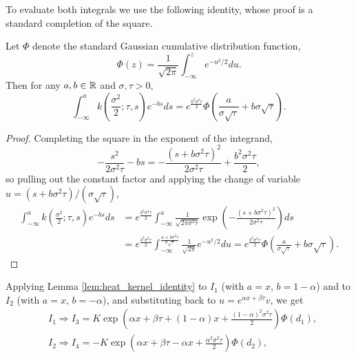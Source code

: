 To evaluate both integrals we use the following identity,
whose proof is a standard completion of the square.
\begin{lemma}\label{lem:heat_kernel_identity}
    Let $\Phi$ denote the standard Gaussian cumulative distribution function,
    \begin{equation*}
        \Phi(z) = \frac{1}{\sqrt{2 \pi}} \int^{z}_{-\infty} e^{-u^2/2} du.
    \end{equation*}
    Then for any $a, b \in \mathbb{R}$ and $\sigma, \tau > 0$,
    \begin{equation}\label{eq:heat_kernel_identity}
        \int^{a}_{-\infty} k\left(\frac{\sigma^2}{2}; \tau, s\right) e^{-b s} ds
            = e^{\frac{b^2 \sigma^2 \tau}{2}} \Phi \left(\frac{a}{\sigma \sqrt{\tau}} + b \sigma \sqrt{\tau}\right).
    \end{equation}
\end{lemma}
\begin{proof}
    Completing the square in the exponent of the integrand,
    \begin{equation*}
        -\frac{s^2}{2 \sigma^2 \tau} - b s
            = -\frac{(s + b \sigma^2 \tau)^2}{2 \sigma^2 \tau} + \frac{b^2 \sigma^2 \tau}{2},
    \end{equation*}
    so pulling out the constant factor and applying the change of variable $u = (s + b \sigma^2 \tau)/(\sigma \sqrt{\tau})$,
    \begin{equation*}
    \begin{aligned}
        \int^{a}_{-\infty} k\left(\tfrac{\sigma^2}{2}; \tau, s\right) e^{-b s} ds
            & = e^{\frac{b^2 \sigma^2 \tau}{2}} \int^{a}_{-\infty} \frac{1}{\sqrt{2 \pi \sigma^2 \tau}} \exp\left( -\frac{(s + b \sigma^2 \tau)^2}{2 \sigma^2 \tau} \right) ds \\
            & = e^{\frac{b^2 \sigma^2 \tau}{2}} \int^{\frac{a + b \sigma^2 \tau}{\sigma \sqrt{\tau}}}_{-\infty} \frac{1}{\sqrt{2 \pi}} e^{-u^2/2} du
            = e^{\frac{b^2 \sigma^2 \tau}{2}} \Phi \left( \frac{a}{\sigma \sqrt{\tau}} + b \sigma \sqrt{\tau} \right).
    \end{aligned}
    \end{equation*}
\end{proof}
Applying Lemma \ref{lem:heat_kernel_identity} to $I_1$ (with $a = x$, $b = 1 - \alpha$) and to $I_2$ (with $a = x$, $b = -\alpha$),
and substituting back to $u = e^{\alpha x + \beta \tau} v$,
we get
\begin{equation*}
\begin{aligned}
    & I_1 \Rightarrow I_3 = K \exp \left( \alpha x + \beta \tau + (1 - \alpha) x + \frac{(1 - \alpha)^2 \sigma^2 \tau}{2} \right) \Phi(d_1), \\
    & I_2 \Rightarrow I_4 = - K \exp \left( \alpha x + \beta \tau - \alpha x + \frac{\alpha^2 \sigma^2 \tau}{2} \right) \Phi(d_2), \\
\end{aligned}
\end{equation*}
